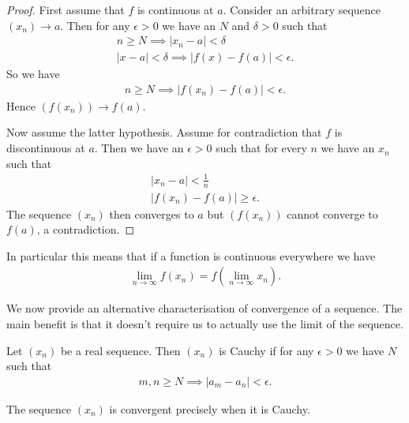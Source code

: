 \documentclass[]{article}
\begin{document}
\begin{proof}
		First assume that $f$ is continuous at $a$. Consider an arbitrary sequence $(x_n) \to a$. Then for any $\epsilon > 0$ we have an $N$ and $\delta > 0$ such that
		\begin{align*}
				n \geq N \implies |x_n - a| < \delta \\
				|x - a| < \delta \implies |f(x) - f(a)| < \epsilon.
		\end{align*}
		So we have
		\begin{align*}
				n \geq N \implies |f(x_n) - f(a)| < \epsilon.
		\end{align*}
		Hence $(f(x_n)) \to f(a)$. 

		Now assume the latter hypothesis. Assume for contradiction that $f$ is discontinuous at $a$. Then we have an $\epsilon > 0$ such that for every  $n$ we have an  $x_n$ such that
		\begin{align*}
				|x_n - a| < \frac{1}{n}\\
				|f(x_n) - f(a)| \geq \epsilon.
		\end{align*}
		The sequence $(x_n)$ then converges to $a$ but $(f(x_n))$ cannot converge to $f(a)$, a contradiction.
\end{proof}

In particular this means that if a function is continuous everywhere we have
\begin{align*}
		\lim_{n \to \infty} f(x_n) = f\left(\lim_{n \to \infty} x_n\right).
\end{align*}

We now provide an alternative characterisation of convergence of a sequence. The main benefit is that it doesn't require us to actually use the limit of the sequence.

\begin{defi} 
		Let $(x_n)$ be a real sequence. Then $(x_n)$ is Cauchy if for any $\epsilon > 0$ we have $N$ such that
		\begin{align*}
				m,n \geq N \implies |a_m - a_n| < \epsilon.
		\end{align*}
\end{defi}

\begin{thm} 
		The sequence $(x_n)$ is convergent precisely when it is Cauchy.		
\end{thm}
\end{document}
